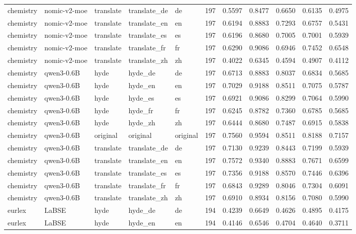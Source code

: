 \begin{tabular}{lllllrrrrrr}
chemistry & nomic-v2-moe & translate & translate\_de & de & 197 & 0.5597 & 0.8477 & 0.6650 & 0.6135 & 0.4975 \\
chemistry & nomic-v2-moe & translate & translate\_en & en & 197 & 0.6194 & 0.8883 & 0.7293 & 0.6757 & 0.5431 \\
chemistry & nomic-v2-moe & translate & translate\_es & es & 197 & 0.6196 & 0.8680 & 0.7005 & 0.7001 & 0.5939 \\
chemistry & nomic-v2-moe & translate & translate\_fr & fr & 197 & 0.6290 & 0.9086 & 0.6946 & 0.7452 & 0.6548 \\
chemistry & nomic-v2-moe & translate & translate\_zh & zh & 197 & 0.4022 & 0.6345 & 0.4594 & 0.4907 & 0.4112 \\
chemistry & qwen3-0.6B & hyde & hyde\_de & de & 197 & 0.6713 & 0.8883 & 0.8037 & 0.6834 & 0.5685 \\
chemistry & qwen3-0.6B & hyde & hyde\_en & en & 197 & 0.7029 & 0.9188 & 0.8511 & 0.7075 & 0.5787 \\
chemistry & qwen3-0.6B & hyde & hyde\_es & es & 197 & 0.6921 & 0.9086 & 0.8299 & 0.7064 & 0.5990 \\
chemistry & qwen3-0.6B & hyde & hyde\_fr & fr & 197 & 0.6245 & 0.8782 & 0.7360 & 0.6785 & 0.5685 \\
chemistry & qwen3-0.6B & hyde & hyde\_zh & zh & 197 & 0.6444 & 0.8680 & 0.7487 & 0.6915 & 0.5838 \\
chemistry & qwen3-0.6B & original & original & original & 197 & 0.7560 & 0.9594 & 0.8511 & 0.8188 & 0.7157 \\
chemistry & qwen3-0.6B & translate & translate\_de & de & 197 & 0.7130 & 0.9239 & 0.8443 & 0.7199 & 0.5939 \\
chemistry & qwen3-0.6B & translate & translate\_en & en & 197 & 0.7572 & 0.9340 & 0.8883 & 0.7671 & 0.6599 \\
chemistry & qwen3-0.6B & translate & translate\_es & es & 197 & 0.7356 & 0.9188 & 0.8570 & 0.7446 & 0.6396 \\
chemistry & qwen3-0.6B & translate & translate\_fr & fr & 197 & 0.6843 & 0.9289 & 0.8046 & 0.7304 & 0.6091 \\
chemistry & qwen3-0.6B & translate & translate\_zh & zh & 197 & 0.6910 & 0.8934 & 0.8156 & 0.7080 & 0.5990 \\
eurlex & LaBSE & hyde & hyde\_de & de & 194 & 0.4239 & 0.6649 & 0.4626 & 0.4895 & 0.4175 \\
eurlex & LaBSE & hyde & hyde\_en & en & 194 & 0.4146 & 0.6546 & 0.4704 & 0.4640 & 0.3711 \\

\end{tabular}
